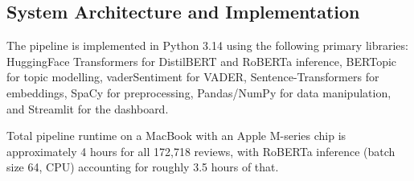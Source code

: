 \subsection{System Architecture and Implementation}
\begin{justify}
The pipeline is implemented in Python 3.14 using the following primary libraries: HuggingFace Transformers \cite{wolf2020transformers} for DistilBERT and RoBERTa inference, BERTopic \cite{grootendorst2022bertopic} for topic modelling, vaderSentiment for VADER, Sentence-Transformers \cite{reimers2019sentencebert} for embeddings, SpaCy \cite{spacy2} for preprocessing, Pandas/NumPy for data manipulation, and Streamlit for the dashboard.

Total pipeline runtime on a MacBook with an Apple M-series chip is approximately 4 hours for all 172,718 reviews, with RoBERTa inference (batch size 64, CPU) accounting for roughly 3.5 hours of that.
\end{justify}
